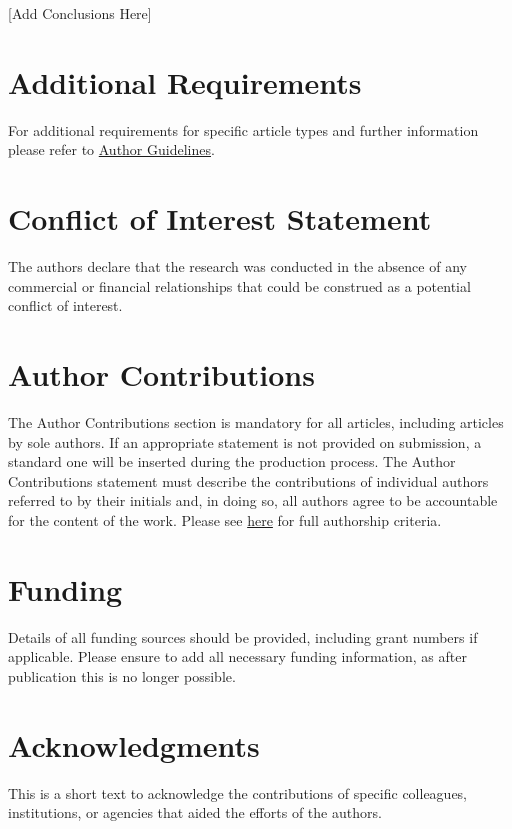 \documentclass[utf8]{frontiersSCNS}
\begin{document}
{[Add Conclusions Here]


\section{Additional Requirements}

For additional requirements for specific article types and further information please refer to \href{http://www.frontiersin.org/about/AuthorGuidelines#AdditionalRequirements}{Author Guidelines}.

\section*{Conflict of Interest Statement}

The authors declare that the research was conducted in the absence of any commercial or financial relationships that could be construed as a potential conflict of interest.

\section*{Author Contributions}

The Author Contributions section is mandatory for all articles, including articles by sole authors. If an appropriate statement is not provided on submission, a standard one will be inserted during the production process. The Author Contributions statement must describe the contributions of individual authors referred to by their initials and, in doing so, all authors agree to be accountable for the content of the work. Please see  \href{http://home.frontiersin.org/about/author-guidelines#AuthorandContributors}{here} for full authorship criteria.

\section*{Funding}
Details of all funding sources should be provided, including grant numbers if applicable. Please ensure to add all necessary funding information, as after publication this is no longer possible.

\section*{Acknowledgments}
This is a short text to acknowledge the contributions of specific colleagues, institutions, or agencies that aided the efforts of the authors.

}
\end{document}
